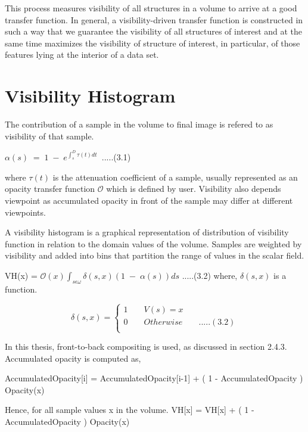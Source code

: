 This process measures visibility of all structures in a volume to arrive at a good transfer function. In general, a visibility-driven transfer function is constructed in such a way that we guarantee the visibility of all structures of interest and at the same time maximizes the visibility of structure of interest, in particular, of those features lying at the interior of a data set. 


\section{Visibility Histogram}

The contribution of a sample in the volume to final image is refered to as visibility of that sample. 


$ \alpha (s) \; = \; 1 \; - \; e^{\int^{D}_{s} \tau(t) dt \; } $   .....(3.1)


where $ \tau(t) $ is the attenuation coefficient of a sample, usually represented as an opacity transfer function $\mathcal{O}$ which is defined by user. Visibility also depends viewpoint as accumulated opacity in front of the sample may differ at different viewpoints. 

A visibility histogram is a graphical representation of distribution of visibility function in relation to the domain values of the volume. Samples are weighted by visibility and added into bins that partition the range of values in the scalar field. 

VH(x) = $ \mathcal{O} (x) \int_{s \epsilon \omega} \delta(s, x) (1 \; - \; \alpha(s) ) ds $  .....(3.2)
where, $ \delta(s, x) $ is a function.


\[
    \delta(s, x)=\left\{
                \begin{array}{ll}
                  1  \;\;\;\;\;\;\;    V(s) = x\\
                  0  \;\;\;\;\;\;\;    Otherwise \;\;\;\;\;\;\; .....(3.2)\\
                \end{array}
              \right.
\]



In this thesis, front-to-back compositing is used, as discussed in section 2.4.3. Accumulated opacity is computed as, 


AccumulatedOpacity[i] = AccumulatedOpacity[i-1] + ( 1 - AccumulatedOpacity ) Opacity(x) 

Hence, for all sample values x in the volume.
VH[x] = VH[x] + ( 1 - AccumulatedOpacity ) Opacity(x)


